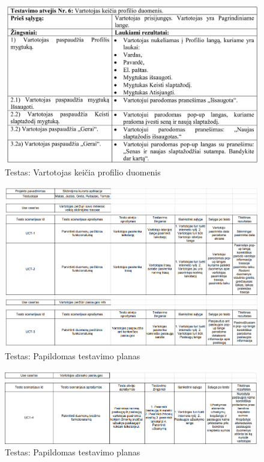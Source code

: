 \documentclass[oneside]{VUMIFPSkursinis}
\begin{document}
			\begin{figure}[h]
    				\centering
    				\includegraphics[width=1\textwidth]{test6.png}
    				\caption{Testas: Vartotojas keičia profilio duomenis}
    				\label{fig:Testas: Vartotojas keičia profilio duomenis}
			\end{figure}

			\begin{figure}[h]
    				\centering
    				\includegraphics[width=1\textwidth]{testPlanPartOne.png}
    				\caption{Testas: Papildomas testavimo planas}
    				\label{fig:Testas:Papildomas testavimo planas}
			\end{figure}

			\begin{figure}[h]
    				\centering
    				\includegraphics[width=1\textwidth]{testPlanPartTwo.png}
    				\caption{Testas: Papildomas testavimo planas}
    				\label{fig:Testas:Papildomas testavimo planas}
			\end{figure}
\end{document}
